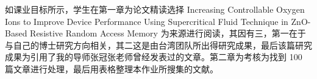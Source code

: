 \begin{cabstract}
如课业目标所示，学生在第一章为论文精读选择 Increasing Controllable Oxygen Ions to Improve Device Performance Using Supercritical Fluid Technique in ZnO-Based Resistive Random Access Memory 为来源进行阅读，其因有三，第一在于与自己的博士研究方向相关，其二这是由台湾团队所出得研究成果，最后该篇研究成果为引用了我的导师张冠张老师曾经发表过的文章。第二章为考核为找到 100 篇文章进行处理，最后用表格整理本作业所搜集的文献。

\end{cabstract}


